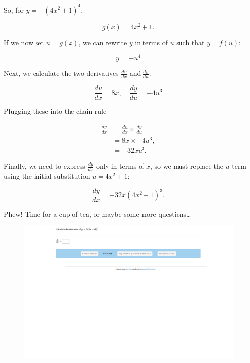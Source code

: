 \documentclass[
  a4paper,
]{scrbook}
\begin{document}
So, for \(y=-(4x^2+1)^4\),

\[
g(x)=4x^2+1.
\]

If we now set \(u=g(x)\), we can rewrite \(y\) in terms of \(u\) such
that \(y=f(u)\):

\[
y=-u^4
\]

Next, we calculate the two derivatives \(\frac{du}{dx}\) and
\(\frac{dy}{du}\):

\[
\frac{du}{dx}=8x, \quad \frac{dy}{du}=-4u^3
\]

Plugging these into the chain rule:

\[
\begin{aligned}
\frac{dy}{dx} &= \frac{du}{dx} \times \frac{dy}{du}, \\
&= 8x \times-4u^3, \\ 
&= -32xu^3. 
\end{aligned} 
\]

Finally, we need to express \(\frac{dy}{dx}\) only in terms of \(x\), so
we must replace the \(u\) term using the initial substitution
\(u=4x^2+1\):

\[
\frac{dy}{dx} =-32x(4x^2+1)^3.
\]

Phew! Time for a cup of tea, or maybe some more questions\ldots{}

\begin{figure}

{\centering 

\href{https://numbas.mathcentre.ac.uk/question/91317/differentiation-chain-rule-3/embed/?token=0ac77949-e57a-40a4-9e69-200c7817cc9e}{\includegraphics{./12-further-differentiation_files/figure-pdf/unnamed-chunk-2-1.png}}

}

\end{figure}
\end{document}
